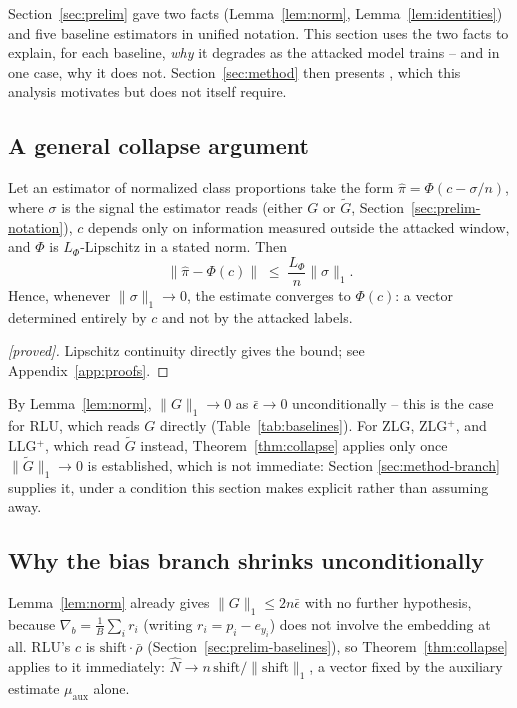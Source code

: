 Section~\ref{sec:prelim} gave two facts (Lemma~\ref{lem:norm},
Lemma~\ref{lem:identities}) and five baseline estimators in unified
notation. This section uses the two facts to explain, for each baseline,
\emph{why} it degrades as the attacked model trains -- and in one case,
why it does not. Section~\ref{sec:method} then presents \ourmethod{},
which this analysis motivates but does not itself require.

\subsection{A general collapse argument}
\label{sec:method-collapse}

\begin{theorem}
\label{thm:collapse}
Let an estimator of normalized class proportions take the form
$\widehat\pi = \Phi(c - \sigma/n)$, where $\sigma$ is the signal the
estimator reads (either $G$ or $\widetilde G$, Section~\ref{sec:prelim-notation}),
$c$ depends only on information measured outside the attacked window, and
$\Phi$ is $L_\Phi$-Lipschitz in a stated norm. Then
\[
 \bigl\|\widehat\pi - \Phi(c)\bigr\| \;\le\; \frac{L_\Phi}{n}\|\sigma\|_1 .
\]
Hence, whenever $\|\sigma\|_1 \to 0$, the estimate converges to $\Phi(c)$:
a vector determined entirely by $c$ and not by the attacked labels.
\end{theorem}

\begin{proof}[\textnormal{[proved]}]
Lipschitz continuity directly gives the bound; see
Appendix~\ref{app:proofs}.
\end{proof}

By Lemma~\ref{lem:norm}, $\|G\|_1 \to 0$ as $\bar\epsilon\to0$
unconditionally -- this is the case for RLU, which reads $G$ directly
(Table~\ref{tab:baselines}). For ZLG, ZLG$^+$, and LLG$^+$, which read
$\widetilde G$ instead, Theorem~\ref{thm:collapse} applies only once
$\|\widetilde G\|_1 \to 0$ is established, which is not immediate: Section
\ref{sec:method-branch} supplies it, under a condition this section makes
explicit rather than assuming away.

\subsection{Why the bias branch shrinks unconditionally}

Lemma~\ref{lem:norm} already gives $\|G\|_1 \le 2n\bar\epsilon$ with no
further hypothesis, because $\nabla_b = \tfrac1B\sum_i r_i$ (writing
$r_i = p_i - e_{y_i}$) does not involve the embedding at all. RLU's $c$ is
$\mathrm{shift}\cdot\bar\rho$ (Section~\ref{sec:prelim-baselines}), so
Theorem~\ref{thm:collapse} applies to it immediately: $\widehat N \to
n\,\mathrm{shift}/\|\mathrm{shift}\|_1$, a vector fixed by the auxiliary
estimate $\mu_{\mathrm{aux}}$ alone.

